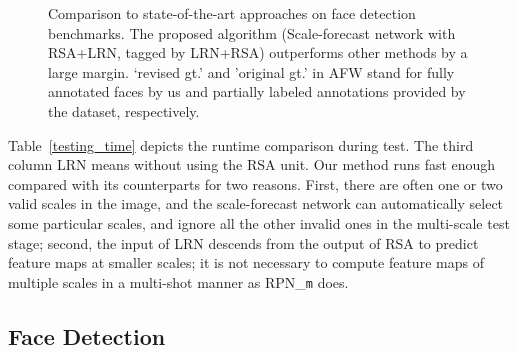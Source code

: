 \documentclass[10pt,twocolumn,letterpaper]{article}
\begin{document}
\begin{figure}
{		\label{afw_pr}
	} 
	\caption{Comparison to state-of-the-art approaches on face detection benchmarks. 
		The proposed algorithm (Scale-forecast network with RSA+LRN, tagged by LRN+RSA) outperforms other methods by a large margin.
		`revised gt.' and 'original gt.' in AFW stand for fully annotated faces by us and partially labeled annotations provided by the dataset, respectively.
	}  
	\label{com_to_soa}
\end{figure}



Table~\ref{testing_time} depicts the runtime comparison during test. 
%
The third column LRN means without using the RSA unit.
Our method runs fast enough compared with its counterparts for two reasons. First, there are often one or two valid scales in the image, and the scale-forecast network can automatically select some particular scales, and ignore all the other invalid ones in the multi-scale test stage; 
%
second, the input of LRN descends from the output of RSA to predict feature maps at smaller scales; it is not necessary to compute feature maps of multiple scales in a multi-shot manner as RPN\_\texttt{m} does.

\subsection{Face Detection}
\label{state_of_the_art}
\end{document}
